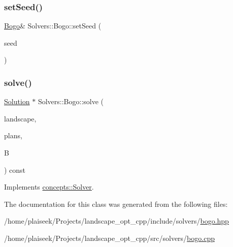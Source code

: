\mbox{\label{class_solvers_1_1_bogo_ae47a955e952670eba66efad35c824023}} 
\subsubsection{\texorpdfstring{set\+Seed()}{setSeed()}}
{\footnotesize\ttfamily \hyperlink{class_solvers_1_1_bogo}{Bogo}\& Solvers\+::\+Bogo\+::set\+Seed (\begin{DoxyParamCaption}\item[{int}]{seed }\end{DoxyParamCaption})\hspace{0.3cm}{\ttfamily [inline]}}

\mbox{\label{class_solvers_1_1_bogo_a094c019a0efda929bd2369d2a47256f6}} 
\subsubsection{\texorpdfstring{solve()}{solve()}}
{\footnotesize\ttfamily \hyperlink{class_solution}{Solution} $\ast$ Solvers\+::\+Bogo\+::solve (\begin{DoxyParamCaption}\item[{const \hyperlink{class_landscape}{Landscape} \&}]{landscape,  }\item[{const \hyperlink{class_restoration_plan}{Restoration\+Plan} \&}]{plans,  }\item[{const double}]{B }\end{DoxyParamCaption}) const\hspace{0.3cm}{\ttfamily [virtual]}}



Implements \hyperlink{classconcepts_1_1_solver_af323ad29df1e7b87facd7dc007568c80}{concepts\+::\+Solver}.



The documentation for this class was generated from the following files\+:\begin{DoxyCompactItemize}
\item 
/home/plaiseek/\+Projects/landscape\+\_\+opt\+\_\+cpp/include/solvers/\hyperlink{bogo_8hpp}{bogo.\+hpp}\item 
/home/plaiseek/\+Projects/landscape\+\_\+opt\+\_\+cpp/src/solvers/\hyperlink{bogo_8cpp}{bogo.\+cpp}\end{DoxyCompactItemize}
